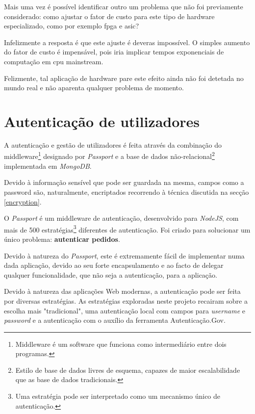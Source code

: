 Mais uma vez é possível identificar outro um problema que não foi previamente considerado: como ajustar o fator de custo para este tipo de hardware especializado, como por exemplo \gls{fpga} e \gls{asic}?

Infelizmente a resposta é que este ajuste é deveras impossível. O simples aumento do fator de custo é impensável, pois iria implicar tempos exponenciais de computação em \gls{cpu} mainstream.

Felizmente, tal aplicação de hardware pare este efeito ainda não foi detetada no mundo real e não aparenta qualquer problema de momento.

\cleardoublepage
\section{Autenticação de utilizadores}
A autenticação e gestão de utilizadores é feita através da combinação do middleware\footnote{Middleware é um software que funciona como intermediário entre dois programas.} designado por \emph{Passport} e a base de dados não-relacional\footnote{Estilo de base de dados livres de esquema, capazes de maior escalabilidade que as base de dados tradicionais.} implementada em \emph{MongoDB}.

Devido à informação sensível que pode ser guardada na mesma, campos como a password são, naturalmente, encriptados recorrendo à técnica discutida na secção \ref{encryption}.

O \emph{Passport} é um middleware de autenticação, desenvolvido para \emph{NodeJS}, com mais de 500 estratégias\footnote{Uma estratégia pode ser interpretado como um mecanismo único de autenticação.} diferentes de autenticação. Foi criado para solucionar um único problema: \textbf{autenticar pedidos}.

Devido à natureza do \emph{Passport}, este é extremamente fácil de implementar numa dada aplicação, devido ao seu forte encapsulamento e ao facto de delegar qualquer funcionalidade, que não seja a autenticação, para a aplicação.

Devido à natureza das aplicações Web modernas, a autenticação pode ser feita por diversas estratégias. As estratégias exploradas neste projeto recairam sobre a escolha mais "tradicional", uma autenticação local com campos para \emph{username} e \emph{password} e a autenticação com o auxílio da ferramenta Autenticação.Gov.

